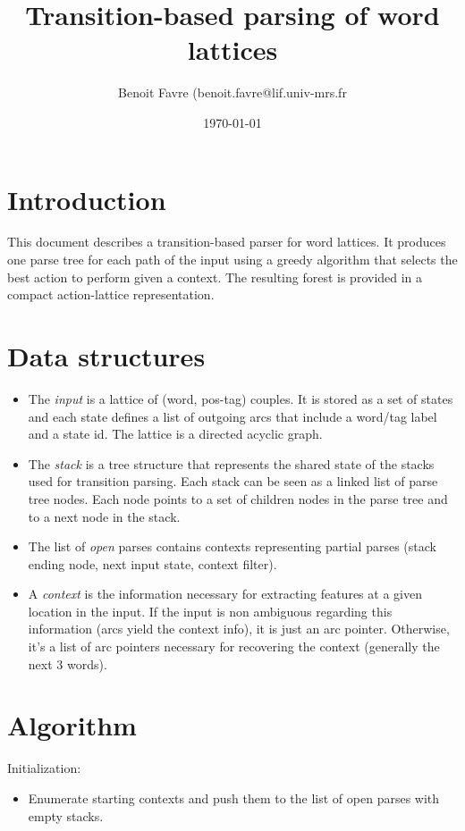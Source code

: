 \documentclass{article}
\title{Transition-based parsing of word lattices}
\author{Benoit Favre (benoit.favre@lif.univ-mrs.fr}
\date{\today}
\begin{document}
\maketitle

\section{Introduction}

This document describes a transition-based parser for word lattices. It produces one parse tree for each path of the input using a greedy
algorithm that selects the best action to perform given a context. The resulting forest is provided in a compact action-lattice representation.

\section{Data structures}

\begin{itemize}
\item The {\it input} is a lattice of (word, pos-tag) couples. It is stored as a set of states and each state defines a list of outgoing arcs that include a word/tag label and a state id. The lattice is a directed acyclic graph.
\item The {\it stack} is a tree structure that represents the shared state of the stacks used for transition parsing. Each stack can be seen as a linked list of parse tree nodes. Each node points to a set of children nodes in the parse tree and to a next node in the stack.
\item The list of {\it open} parses contains contexts representing partial parses (stack ending node, next input state, context filter).
\item A {\it context} is the information necessary for extracting features at a given location in the input. If the input is non ambiguous regarding this information (arcs yield the context info), it is just an arc pointer. Otherwise, it's a list of arc pointers necessary for recovering the context (generally the next 3 words).
\end{itemize}

\section{Algorithm}

Initialization:
\begin{itemize}
\item Enumerate starting contexts and push them to the list of open parses with empty stacks.
\end{itemize}
\end{document}
